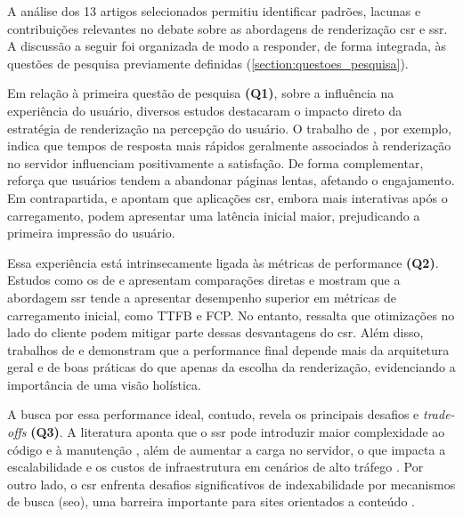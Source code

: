 A análise dos 13 artigos selecionados permitiu identificar padrões, lacunas e contribuições relevantes no debate sobre as abordagens de renderização \acrshort{csr} e \acrshort{ssr}. A discussão a seguir foi organizada de modo a responder, de forma integrada, às questões de pesquisa previamente definidas (\autoref{section:questoes_pesquisa}).

Em relação à primeira questão de pesquisa \textbf{(Q1)}, sobre a influência na experiência do usuário, diversos estudos destacaram o impacto direto da estratégia de renderização na percepção do usuário. O trabalho de \cite{Zhou2022}, por exemplo, indica que tempos de resposta mais rápidos geralmente associados à renderização no servidor influenciam positivamente a satisfação. De forma complementar, \cite{Lacom2022} reforça que usuários tendem a abandonar páginas lentas, afetando o engajamento. Em contrapartida, \cite{Pokhriyal2024338} e \cite{Keshari20231571} apontam que aplicações \acrshort{csr}, embora mais interativas após o carregamento, podem apresentar uma latência inicial maior, prejudicando a primeira impressão do usuário.

Essa experiência está intrinsecamente ligada às métricas de performance \textbf{(Q2)}. Estudos como os de \cite{FadhilahIskandar2020} e \cite{Angkasa2023} apresentam comparações diretas e mostram que a abordagem \acrshort{ssr} tende a apresentar desempenho superior em métricas de carregamento inicial, como TTFB e FCP. No entanto, \cite{Pavic20211753} ressalta que otimizações no lado do cliente podem mitigar parte dessas desvantagens do \acrshort{csr}. Além disso, trabalhos de \cite{Bekmanova2024265} e \cite{Klochkov2021} demonstram que a performance final depende mais da arquitetura geral e de boas práticas do que apenas da escolha da renderização, evidenciando a importância de uma visão holística.

A busca por essa performance ideal, contudo, revela os principais desafios e \textit{trade-offs} \textbf{(Q3)}. A literatura aponta que o \acrshort{ssr} pode introduzir maior complexidade ao código e à manutenção \cite{Carvalho2025458}, além de aumentar a carga no servidor, o que impacta a escalabilidade e os custos de infraestrutura em cenários de alto tráfego \cite{Angkasa2023}. Por outro lado, o \acrshort{csr} enfrenta desafios significativos de indexabilidade por mecanismos de busca (\acrshort{seo}), uma barreira importante para sites orientados a conteúdo \cite{Kowalczyk202411597}.

